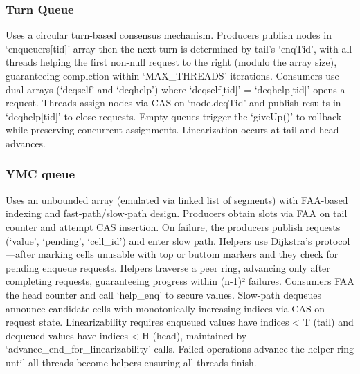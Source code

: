 \subsubsection{Turn Queue} 
Uses a circular turn-based consensus mechanism. Producers publish nodes in \enquote*{enqueuers[tid]} array then the next turn is determined by tail's \enquote*{enqTid}, with all threads helping the first non-null request to the right (modulo the array size), guaranteeing completion within \enquote*{MAX\_THREADS} iterations. Consumers use dual arrays (\enquote*{deqself} and \enquote*{deqhelp}) where \enquote*{deqself[tid]} = \enquote*{deqhelp[tid]} opens a request. Threads assign nodes via \ac{CAS} on \enquote*{node.deqTid} and publish results in \enquote*{deqhelp[tid]} to close requests. Empty queues trigger the \enquote*{giveUp()} to rollback while preserving concurrent assignments. Linearization occurs at tail and head advances. \cite{RamalheteQueue}

\subsubsection{YMC queue} 
Uses an unbounded array (emulated via linked list of segments) with \ac{FAA}-based indexing and fast-path/slow-path design. Producers obtain slots via \ac{FAA} on tail counter and attempt \ac{CAS} insertion. On failure, the producers publish requests (\enquote*{value}, \enquote*{pending}, \enquote*{cell\_id}) and enter slow path. Helpers use Dijkstra's protocol—after marking cells unusable with top or buttom markers and they check for pending enqueue requests. Helpers traverse a peer ring, advancing only after completing requests, guaranteeing progress within (n-1)² failures. Consumers \ac{FAA} the head counter and call \enquote*{help\_enq} to secure values. Slow-path dequeues announce candidate cells with monotonically increasing indices via \ac{CAS} on request state. Linearizability requires enqueued values have indices < T (tail) and dequeued values have indices < H (head), maintained by \enquote*{advance\_end\_for\_linearizability} calls. Failed operations advance the helper ring until all threads become helpers ensuring all threads finish. \cite{FastFetchAndAddWaitFreeQueue}

